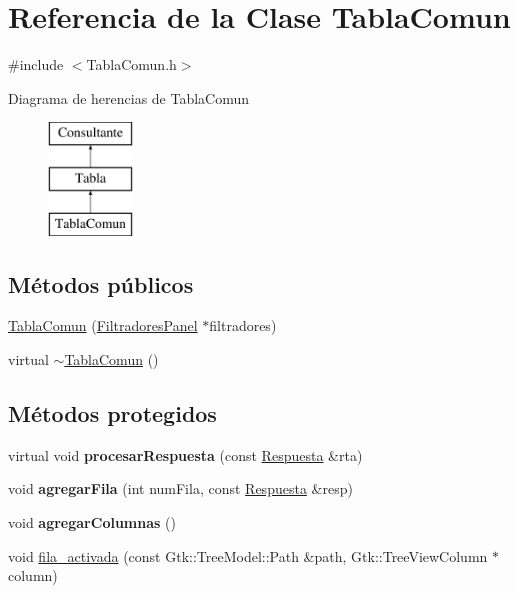 \hypertarget{classTablaComun}{\section{\-Referencia de la \-Clase \-Tabla\-Comun}
\label{classTablaComun}
}


{\ttfamily \#include $<$\-Tabla\-Comun.\-h$>$}

\-Diagrama de herencias de \-Tabla\-Comun\begin{figure}[H]
\begin{center}
\leavevmode
\includegraphics[height=3.000000cm]{classTablaComun}
\end{center}
\end{figure}
\subsection*{\-Métodos públicos}
\begin{DoxyCompactItemize}
\item 
\hyperlink{classTablaComun_a3c6d2d5d000807ed6e9d360982328fbd}{\-Tabla\-Comun} (\hyperlink{classFiltradoresPanel}{\-Filtradores\-Panel} $\ast$filtradores)
\item 
virtual \hyperlink{classTablaComun_aa93de4d0703966dbfcfa178327cd3de3}{$\sim$\-Tabla\-Comun} ()
\end{DoxyCompactItemize}
\subsection*{\-Métodos protegidos}
\begin{DoxyCompactItemize}
\item 
\hypertarget{classTablaComun_a849ad22dec9cbb565b320ba4e5927f17}{virtual void {\bfseries procesar\-Respuesta} (const \hyperlink{classRespuesta}{\-Respuesta} \&rta)}\label{classTablaComun_a849ad22dec9cbb565b320ba4e5927f17}

\item 
\hypertarget{classTablaComun_acee1b9e1fd7ad451c25454aa2c74ddd3}{void {\bfseries agregar\-Fila} (int num\-Fila, const \hyperlink{classRespuesta}{\-Respuesta} \&resp)}\label{classTablaComun_acee1b9e1fd7ad451c25454aa2c74ddd3}

\item 
\hypertarget{classTablaComun_aba13fc035e45b08fa27af781b0d92b1c}{void {\bfseries agregar\-Columnas} ()}\label{classTablaComun_aba13fc035e45b08fa27af781b0d92b1c}

\item 
void \hyperlink{classTablaComun_a6df26712c8f8dc3c09b1d789cd103ab9}{fila\-\_\-activada} (const \-Gtk\-::\-Tree\-Model\-::\-Path \&path, \-Gtk\-::\-Tree\-View\-Column $\ast$column)
\end{DoxyCompactItemize}
